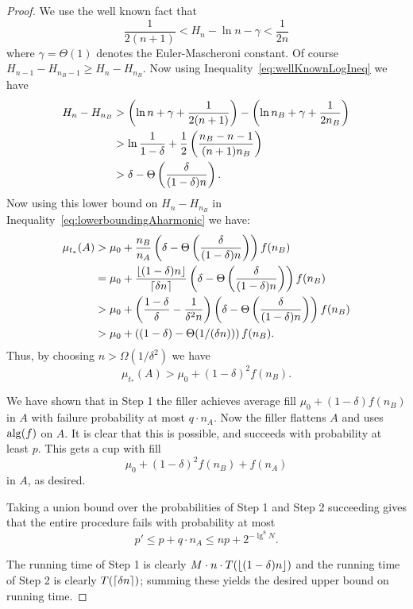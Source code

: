\begin{proof}
  We use the well known fact that 
  \begin{equation}
    \label{eq:wellKnownLogIneq}
    \frac{1}{2(n+1)} < H_n - \ln n - \gamma < \frac{1}{2n}
  \end{equation}
  where $\gamma = \Theta(1)$ denotes the Euler-Mascheroni constant.
  Of course $H_{n-1}-H_{n_B-1} \ge H_n - H_{n_B}.$ Now using
  Inequality~\eqref{eq:wellKnownLogIneq} we have
  \begin{align*}
    H_n - H_{n_B} &> \left( \ln n + \gamma + \frac{1}{2(n+1)} \right) - \left( \ln n_B + \gamma + \frac{1}{2n_B} \right)\\
                  &> \ln \frac{1}{1-\delta} + \frac{1}{2}\left( \frac{n_B-n-1}{(n+1)n_B} \right)\\
                  &> \delta - \Theta\left( \frac{\delta}{(1-\delta)n} \right).
  \end{align*}
  Now using this lower bound on $H_n - H_{n_B}$ in
  Inequality~\eqref{eq:lowerboundingAharmonic} we have:
  \begin{align*}
    \mu_{t_*}(A) &> \mu_0 + \frac{n_B}{n_A}\left( \delta - \Theta\left( \frac{\delta}{(1-\delta)n} \right) \right)f(n_B)\\
                 &= \mu_0 + \frac{\left\lfloor (1-\delta)n \right\rfloor}{\left\lceil \delta n \right\rceil}\left( \delta - \Theta\left( \frac{\delta}{(1-\delta)n} \right) \right)f(n_B)\\
                 &> \mu_0 + \left( \frac{1-\delta}{\delta} - \frac{1}{\delta^2 n} \right)\left( \delta - \Theta\left( \frac{\delta}{(1-\delta)n} \right) \right)f(n_B)\\
                 &> \mu_0 + \left( (1-\delta) - \Theta(1/(\delta n)) \right)f(n_B).
  \end{align*}
  Thus, by choosing $n > \Omega(1/\delta^2)$ we have 
  $$\mu_{t_*}(A) > \mu_0 + (1-\delta)^2 f(n_B).$$

We have shown that in Step 1 the filler achieves average fill
$\mu_0 + (1-\delta)f(n_B)$ in $A$ with failure probability at
most $q\cdot n_A$.
Now the filler flattens $A$ and uses $\operatorname{\text{\textup{alg}}}(f)$ on $A$.
It is clear that this is possible, and succeeds with probability
at least $p$.
This gets a cup with fill 
$$\mu_0 + (1-\delta)^2 f(n_B) + f(n_A)$$
in $A$, as desired.

Taking a union bound over the probabilities of Step 1 and Step 2
succeeding gives that the entire procedure fails with probability
at most 
$$p' \le p + q \cdot n_A \le n p + 2^{-\lg^8 N}.$$

The running time of Step 1 is clearly $M\cdot n\cdot
T(\left\lfloor (1-\delta)n \right\rfloor)$ and the running time of Step 2 is clearly
$T(\left\lceil \delta n \right\rceil)$; summing these yields the desired upper
bound on running time.

\end{proof}


